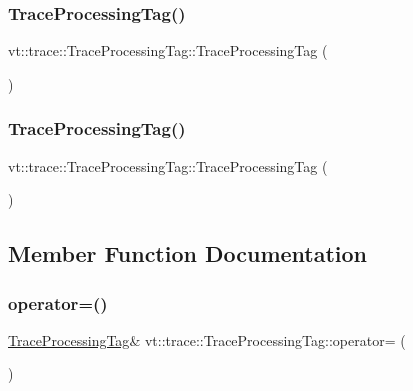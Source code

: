 \subsubsection{\texorpdfstring{Trace\+Processing\+Tag()}{TraceProcessingTag()}\hspace{0.1cm}{\footnotesize\ttfamily [1/2]}}
{\footnotesize\ttfamily vt\+::trace\+::\+Trace\+Processing\+Tag\+::\+Trace\+Processing\+Tag (\begin{DoxyParamCaption}{ }\end{DoxyParamCaption})\hspace{0.3cm}{\ttfamily [default]}}

\mbox{\label{structvt_1_1trace_1_1_trace_processing_tag_a332019e755f6265ab0a74626322c590f}} 
\subsubsection{\texorpdfstring{Trace\+Processing\+Tag()}{TraceProcessingTag()}\hspace{0.1cm}{\footnotesize\ttfamily [2/2]}}
{\footnotesize\ttfamily vt\+::trace\+::\+Trace\+Processing\+Tag\+::\+Trace\+Processing\+Tag (\begin{DoxyParamCaption}\item[{\hyperlink{structvt_1_1trace_1_1_trace_processing_tag}{Trace\+Processing\+Tag} const \&}]{ }\end{DoxyParamCaption})\hspace{0.3cm}{\ttfamily [default]}}



\subsection{Member Function Documentation}
\mbox{\label{structvt_1_1trace_1_1_trace_processing_tag_a56727ddff7dce03576f3ed117235b327}} 
\subsubsection{\texorpdfstring{operator=()}{operator=()}}
{\footnotesize\ttfamily \hyperlink{structvt_1_1trace_1_1_trace_processing_tag}{Trace\+Processing\+Tag}\& vt\+::trace\+::\+Trace\+Processing\+Tag\+::operator= (\begin{DoxyParamCaption}\item[{\hyperlink{structvt_1_1trace_1_1_trace_processing_tag}{Trace\+Processing\+Tag} const \&}]{ }\end{DoxyParamCaption})\hspace{0.3cm}{\ttfamily [default]}}



